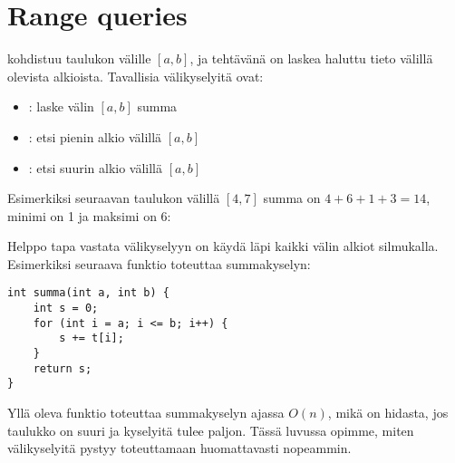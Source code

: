 \chapter{Range queries}


 kohdistuu taulukon välille $[a,b]$,
ja tehtävänä on laskea haluttu tieto välillä olevista alkioista.
Tavallisia välikyselyitä ovat:
\begin{itemize}
\item {}: laske välin $[a,b]$ summa
\item {}: etsi pienin alkio välillä $[a,b]$
\item {}: etsi suurin alkio välillä $[a,b]$
\end{itemize}
Esimerkiksi seuraavan taulukon välillä $[4,7]$
summa on $4+6+1+3=14$, minimi on 1 ja maksimi on 6:
\begin{center}
\end{center}

Helppo tapa vastata välikyselyyn on
käydä läpi kaikki välin alkiot silmukalla.
Esimerkiksi seuraava funktio toteuttaa summakyselyn:

\begin{lstlisting}
int summa(int a, int b) {
    int s = 0;
    for (int i = a; i <= b; i++) {
        s += t[i];
    }
    return s;
}
\end{lstlisting}

Yllä oleva funktio toteuttaa summakyselyn
ajassa $O(n)$, mikä on hidasta,
jos taulukko on suuri ja kyselyitä tulee paljon.
Tässä luvussa opimme, miten välikyselyitä pystyy
toteuttamaan huomattavasti nopeammin.

